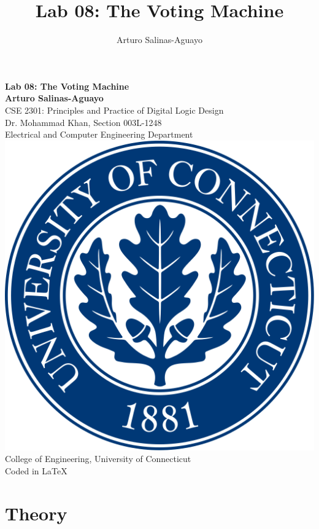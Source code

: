 \documentclass[12pt]{article}
\author{Arturo Salinas-Aguayo}
\title{Lab 08: The Voting Machine}
\begin{document}
\newcommand{\closure}[2][3]{%
	{}\mkern#1mu\overline{\mkern-#1mu#2}}
\newcommand\ncoverline[1]{\mkern1mu\overline{\mkern-1mu#1\mkern-1mu}\mkern1mu}
\begin{titlepage}
	\centering
	\vspace*{3cm}
	\huge\textbf{Lab 08: The Voting Machine}\\
	\vspace{5cm}
	\Large\textbf{Arturo Salinas-Aguayo}\\
	\normalsize
	CSE 2301: Principles and Practice of Digital Logic Design\\
	Dr. Mohammad Khan, Section 003L-1248\\
	Electrical and Computer Engineering Department
	\vfill
	\includegraphics[scale=0.1]{uconnlogo}\\
	College of Engineering, University of Connecticut\\
	\scriptsize{Coded in \LaTeX}
	\vspace*{1cm}
\end{titlepage}
\section*{Theory}
\end{document}
